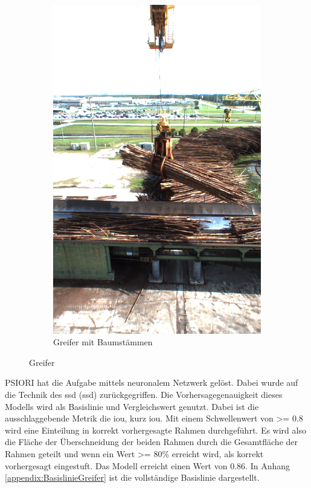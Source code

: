 \begin{figure}[h]
\begin{subfigure}[c]{0.49\textwidth}
			\label{img:Grapple}	
		\end{subfigure}
		\begin{subfigure}[c]{0.49\textwidth}			
			\includegraphics[width=1\textwidth, center]{bilder/Grundlagen/Logs_14.png}
			\caption[Bsp. Bild: Greifer mit Baumstämmen]{Greifer mit Baumstämmen}
			\label{img:Logs}	
		\end{subfigure}
		\caption{Greifer}
		\label{img:Greifer}
	\end{figure}	

	PSIORI hat die Aufgabe mittels neuronalem Netzwerk gelöst. Dabei wurde auf die Technik des \acl{ssd} (\ac{ssd}) \cite{Liu.2015} zurückgegriffen. Die Vorhersagegenauigkeit dieses Modells wird als Basislinie und Vergleichswert genutzt. Dabei ist die ausschlaggebende Metrik die \acl{iou}, kurz \ac{iou}. Mit einem Schwellenwert von >= 0.8 wird eine Einteilung in korrekt vorhergesagte Rahmen durchgeführt. Es wird also die Fläche der Überschneidung der beiden Rahmen durch die Gesamtfläche der Rahmen geteilt und wenn ein Wert >= 80\% erreicht wird, als korrekt vorhergesagt eingestuft. Das Modell erreicht einen Wert von $0.86$. In Anhang \ref{appendix:BasislinieGreifer} ist die vollständige Basislinie dargestellt.
	
